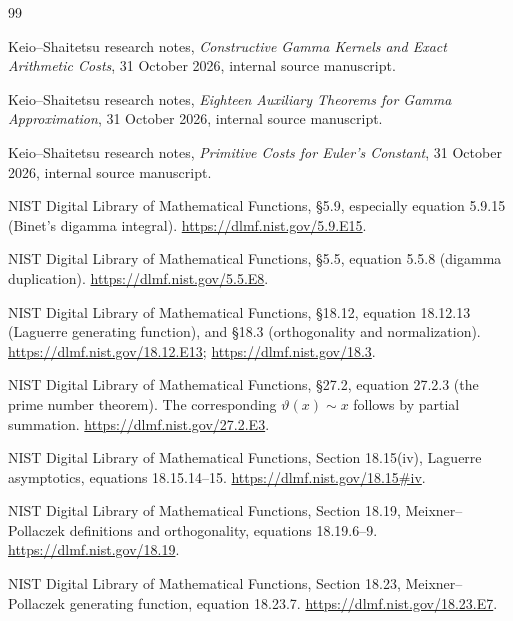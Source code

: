 \documentclass[11pt,a4paper]{article}
\theoremstyle{definition}
\theoremstyle{remark}
\begin{document}
\begin{thebibliography}{99}

Keio--Shaitetsu research notes, \emph{Constructive Gamma Kernels and
Exact Arithmetic Costs}, 31 October 2026, internal source manuscript.

Keio--Shaitetsu research notes, \emph{Eighteen Auxiliary Theorems for
Gamma Approximation}, 31 October 2026, internal source manuscript.

Keio--Shaitetsu research notes, \emph{Primitive Costs for Euler's Constant},
31 October 2026, internal source manuscript.

NIST Digital Library of Mathematical Functions, \S5.9,
especially equation 5.9.15 (Binet's digamma integral).
\url{https://dlmf.nist.gov/5.9.E15}.

NIST Digital Library of Mathematical Functions, \S5.5,
equation 5.5.8 (digamma duplication).
\url{https://dlmf.nist.gov/5.5.E8}.

NIST Digital Library of Mathematical Functions, \S18.12,
equation 18.12.13 (Laguerre generating function), and \S18.3
(orthogonality and normalization).
\url{https://dlmf.nist.gov/18.12.E13};
\url{https://dlmf.nist.gov/18.3}.

NIST Digital Library of Mathematical Functions, \S27.2,
equation 27.2.3 (the prime number theorem).
The corresponding $\vartheta(x)\sim x$ follows by partial summation.
\url{https://dlmf.nist.gov/27.2.E3}.

NIST Digital Library of Mathematical Functions,
Section 18.15(iv), Laguerre asymptotics, equations 18.15.14--15.
\url{https://dlmf.nist.gov/18.15#iv}.

NIST Digital Library of Mathematical Functions,
Section 18.19, Meixner--Pollaczek definitions and orthogonality,
equations 18.19.6--9.
\url{https://dlmf.nist.gov/18.19}.

NIST Digital Library of Mathematical Functions,
Section 18.23, Meixner--Pollaczek generating function,
equation 18.23.7.
\url{https://dlmf.nist.gov/18.23.E7}.

\end{thebibliography}
\end{document}
